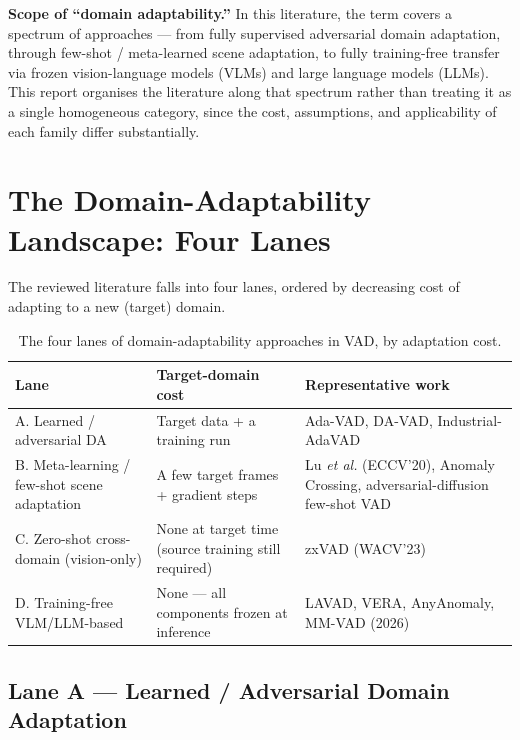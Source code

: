 \documentclass[12pt, a4paper]{article}
\begin{document}
\textbf{Scope of ``domain adaptability.''} In this literature, the term covers
a spectrum of approaches --- from fully supervised adversarial domain
adaptation, through few-shot / meta-learned scene adaptation, to fully
training-free transfer via frozen vision-language models (VLMs) and large
language models (LLMs). This report organises the literature along that
spectrum rather than treating it as a single homogeneous category, since the
cost, assumptions, and applicability of each family differ substantially.

\section{The Domain-Adaptability Landscape: Four Lanes}

The reviewed literature falls into four lanes, ordered by decreasing cost of
adapting to a new (target) domain.

\begin{table}[h!]
\centering
\renewcommand{\arraystretch}{1.35}
\begin{tabularx}{\textwidth}{@{}l L{3.1cm} X@{}}
\toprule
\textbf{Lane} & \textbf{Target-domain cost} & \textbf{Representative work} \\
\midrule
A. Learned / adversarial DA & Target data + a training run & Ada-VAD, DA-VAD, Industrial-AdaVAD \\
B. Meta-learning / few-shot scene adaptation & A few target frames + gradient steps & Lu \textit{et al.} (ECCV'20), Anomaly Crossing, adversarial-diffusion few-shot VAD \\
C. Zero-shot cross-domain (vision-only) & None at target time (source training still required) & zxVAD (WACV'23) \\
D. Training-free VLM/LLM-based & None --- all components frozen at inference & LAVAD, VERA, AnyAnomaly, MM-VAD (2026) \\
\bottomrule
\end{tabularx}
\caption{The four lanes of domain-adaptability approaches in VAD, by adaptation cost.}
\end{table}

\subsection{Lane A --- Learned / Adversarial Domain Adaptation}
\end{document}
